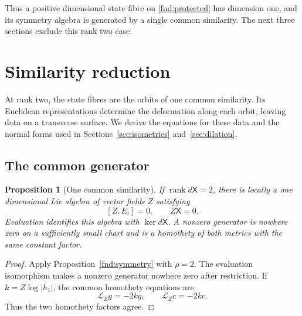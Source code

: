 \documentclass[11pt,a4paper]{article}
\numberwithin{equation}{section}
\theoremstyle{plain}
\newtheorem{proposition}[theorem]{Proposition}
\theoremstyle{definition}
\theoremstyle{remark}
\begin{document}
Thus a positive dimensional state fibre on \eqref{fnd:protected}
has dimension one, and its symmetry algebra is generated by a single
common similarity. The next three sections exclude this rank two
case.

\section{Similarity reduction}\label{sec:similarity}

At rank two, the state fibres are the orbits of one common
similarity. Its Euclidean representations determine the deformation
along each orbit, leaving data on a transverse surface. We derive
the equations for these data and the normal forms used in
Sections~\ref{sec:isometries} and~\ref{sec:dilation}.

\subsection{The common generator}

\begin{proposition}[One common similarity]\label{sim:generator}
If $\operatorname{rank}d\mathsf X=2$, there is locally a one
dimensional Lie algebra of vector fields $Z$ satisfying
\begin{equation}\label{sim:commutation}
[Z,E_i]=0,\qquad Z\mathsf X=0.
\end{equation}
Evaluation identifies this algebra with $\ker d\mathsf X$.
A nonzero generator is nowhere zero on a sufficiently small chart
and is a homothety of both metrics with the same constant factor.
\end{proposition}
\begin{proof}
Apply Proposition~\ref{fnd:symmetry} with $\rho=2$.
The evaluation isomorphism makes a nonzero generator nowhere zero
after restriction. If $k=Z\log|h_1|$, the common homothety equations
are
\begin{equation}\label{sim:equalmetricfactor}
\mathcal L_Zg=-2kg,\qquad \mathcal L_Zc=-2kc.
\end{equation}
Thus the two homothety factors agree.
\end{proof}
\end{document}
